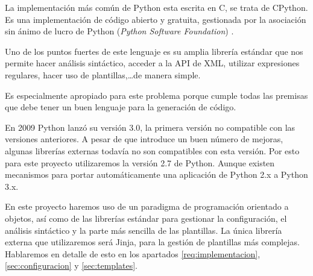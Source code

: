 La implementación más común de Python esta escrita en C, se trata de CPython. Es una implementación de código abierto y gratuita, gestionada por la asociación sin ánimo de lucro  de Python (\emph{Python Software Foundation}) \cite{python}.\medskip\par
Uno de los puntos fuertes de este lenguaje es su amplia librería estándar que nos permite hacer análisis sintáctico, acceder a la API de XML, utilizar expresiones regulares, hacer uso de plantillas,\ldots de manera simple.\par
Es especialmente apropiado para este problema porque cumple todas las premisas que debe tener un buen lenguaje para la generación de código.\par
En 2009 Python lanzó su versión 3.0, la primera versión no compatible con las versiones anteriores. A pesar de que introduce un buen número de mejoras, algunas librerías externas todavía no son compatibles con esta versión. Por esto para este proyecto utilizaremos la versión 2.7 de Python. Aunque existen mecanismos \cite{py:2to3} para portar automáticamente una aplicación de Python 2.x a Python 3.x.\par
En este proyecto haremos uso de un paradigma de programación orientado a objetos, así como de las librerías estándar para gestionar la configuración, el análisis sintáctico y la parte más sencilla de las plantillas. La única librería externa que utilizaremos será Jinja, para la gestión de plantillas más complejas. Hablaremos en detalle de esto en los apartados \ref{req:implementacion}, \ref{sec:configuracion} y \ref{sec:templates}.

